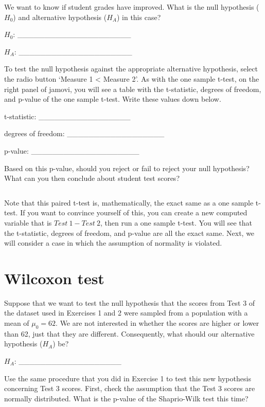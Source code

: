 \documentclass[
  openany]{scrbook}
\begin{document}
We want to know if student grades have improved.
What is the null hypothesis (\(H_{0}\)) and alternative hypothesis (\(H_{A}\)) in this case?

\(H_{0}\): \_\_\_\_\_\_\_\_\_\_\_\_\_\_\_\_\_\_\_\_\_

\(H_{A}\): \_\_\_\_\_\_\_\_\_\_\_\_\_\_\_\_\_\_\_\_\_

To test the null hypothesis against the appropriate alternative hypothesis, select the radio button `Measure 1 \textless{} Measure 2'.
As with the one sample t-test, on the right panel of jamovi, you will see a table with the t-statistic, degrees of freedom, and p-value of the one sample t-test.
Write these values down below.

t-statistic: \_\_\_\_\_\_\_\_\_\_\_\_\_\_\_\_\_

degrees of freedom: \_\_\_\_\_\_\_\_\_\_\_\_\_\_\_\_\_\_

p-value: \_\_\_\_\_\_\_\_\_\_\_\_\_\_\_\_\_\_\_\_

Based on this p-value, should you reject or fail to reject your null hypothesis?
What can you then conclude about student test scores?

\begin{verbatim}
\end{verbatim}

Note that this paired t-test is, mathematically, the exact same as a one sample t-test.
If you want to convince yourself of this, you can create a new computed variable that is \(Test\:1 - Test\:2\), then run a one sample t-test.
You will see that the t-statistic, degrees of freedom, and p-value are all the exact same.
Next, we will consider a case in which the assumption of normality is violated.

\hypertarget{wilcoxon-test-1}{%
\section{Wilcoxon test}\label{wilcoxon-test-1}}

Suppose that we want to test the null hypothesis that the scores from Test 3 of the dataset used in Exercises 1 and 2 were sampled from a population with a mean of \(\mu_{0} = 62\).
We are not interested in whether the scores are higher or lower than 62, just that they are different.
Consequently, what should our alternative hypothesis (\(H_{A}\)) be?

\(H_{A}\): \_\_\_\_\_\_\_\_\_\_\_\_\_\_\_\_\_\_\_

Use the same procedure that you did in Exercise 1 to test this new hypothesis concerning Test 3 scores.
First, check the assumption that the Test 3 scores are normally distributed.
What is the p-value of the Shaprio-Wilk test this time?
\end{document}
